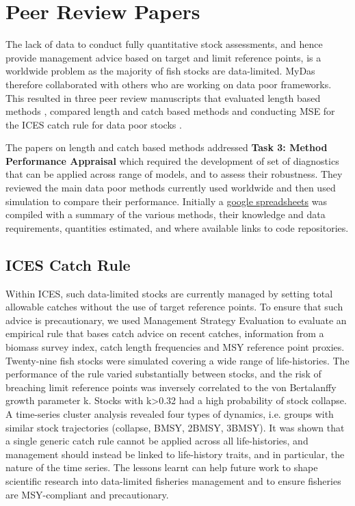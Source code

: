 \newpage
\section{Peer Review Papers}

The lack of data to conduct fully quantitative stock assessments, and hence provide management advice based on target and limit reference points, is a worldwide problem as the majority of fish stocks are data-limited. MyDas therefore collaborated with others who are working on data poor frameworks. This resulted in three peer review manuscripts that evaluated length based methods \citep{pons2019performance}, compared length and catch based methods \citep{pons2019catchlen} and conducting MSE for the ICES catch rule for data poor stocks\citep{fischer2019hcr}
.

The papers on length and catch based methods addressed \textbf{Task 3: Method Performance Appraisal} which required the development of set of diagnostics that can be applied across range of models, and to assess their robustness. They reviewed the main data poor methods currently used worldwide and then used simulation to compare their performance.
Initially a \href{https://docs.google.com/spreadsheets/d/17_qQdzDY41ZrL0yT6QtHpUR4_ydxx_xfCh4GiDqYymU/edit?usp=sharing}{google spreadsheets} was compiled with a summary of the various methods, their knowledge and data requirements, quantities estimated, and where available links to code repositories. 


\subsection{ICES Catch Rule}

Within ICES, such data-limited stocks are currently managed by setting total allowable catches without the use of target reference points. To ensure that such advice is precautionary, we used Management Strategy Evaluation to evaluate an empirical rule that bases catch advice on recent catches, information from a biomass survey index, catch length frequencies and MSY reference point proxies. Twenty-nine fish stocks were simulated covering a wide range of life-histories. The performance of the rule varied substantially between stocks, and the risk of breaching limit reference points was inversely correlated to the von Bertalanffy growth parameter k. Stocks with k>0.32 had a high probability of stock collapse. A time-series cluster analysis revealed four types of dynamics, i.e. groups with similar stock trajectories (collapse, BMSY, 2BMSY, 3BMSY). It was shown that a single generic catch rule cannot be applied across all life-histories, and management should instead be linked to life-history traits, and in particular, the nature of the time series. The lessons learnt can help future work to shape scientific research into data-limited fisheries management and to ensure fisheries are MSY-compliant and precautionary.


